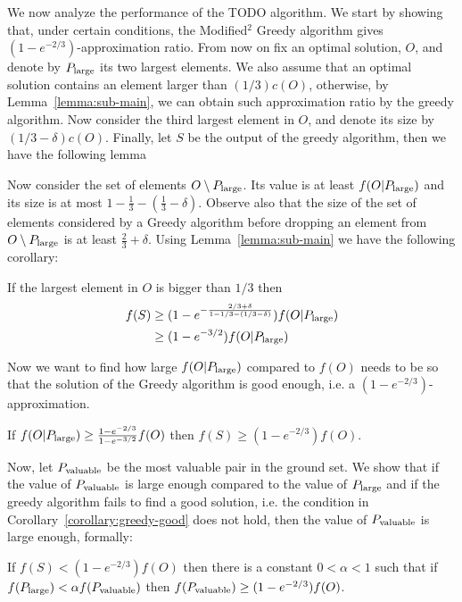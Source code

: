 We now analyze the performance of the TODO algorithm.
We start by showing that,  under certain conditions, the Modified$^2$ Greedy algorithm gives $(1 - e^{-2/3})$-approximation ratio.
From now on fix an optimal solution, $O$, and denote by $P_{\text{large}}$ its two largest elements.
We also assume that an optimal solution contains an element larger than $(1/3)c(O)$, otherwise, by Lemma~\ref{lemma:sub-main}, we can obtain such approximation ratio by the greedy algorithm.
Now consider the third largest element in $O$, and denote its size by $(1/3 - \delta)c(O)$.
Finally, let $S$ be the output of the greedy algorithm, then we have the following lemma

Now consider the set of elements $O \setminus P_{\text{large}}$.
Its value is at least $f(O|P_{\text{large}})$ and its size is at most $1 - \frac{1}{3} - (\frac{1}{3} - \delta)$.
Observe also that the size of the set of elements considered by a Greedy algorithm before dropping an element from $O \setminus P_{\text{large}}$ is at least $\frac{2}{3} + \delta$.
Using Lemma~\ref{lemma:sub-main} we have the following corollary:

\begin{corollary}
	\label{eq:sub:greedy}
	If the largest element in $O$ is bigger than $1/3$ then
	\begin{align*}
		f(S) & \geq (1-e^{-\frac{2/3 + \delta}{1 - 1/3 - (1/3 - \delta)}})f(O|P_{\text{large}})
		\\		& \geq (1 - e^{-3/2})f(O|P_{\text{large}})
	\end{align*}
\end{corollary}

Now we want to find how large $f(O|P_{\text{large}})$ compared to $f(O)$ needs to be so that the solution of the Greedy algorithm is good enough, i.e. a $(1-e^{-2/3})$-approximation.

\begin{corollary}
	\label{corollary:greedy-good}
	If $f(O|P_{\text{large}}) \geq \frac{1-e^{-2/3}}{1-e^{-3/2}}f(O)$ then $f(S) \geq (1 - e^{-2/3})f(O)$.
\end{corollary}

Now, let $P_{\text{valuable}}$ be the most valuable pair in the ground set.
We show that if the value of $P_{\text{valuable}}$ is large enough compared to the value of $P_{\text{large}}$ and if the greedy algorithm fails to find a good solution, i.e. the condition in Corollary~\ref{corollary:greedy-good} does not hold, then the value of $P_{\text{valuable}}$ is large enough, formally:

\begin{lemma}
	\label{lemma:sub:alpha}
	If $f(S) < (1 - e^{-2/3})f(O)$ then there is a constant $0 < \alpha < 1$ such that if $f(P_{\text{large}}) < \alpha f(P_{\text{valuable}})$ then $f(P_{\text{valuable}}) \geq (1 - e^{-2/3})f(O)$.
\end{lemma}

